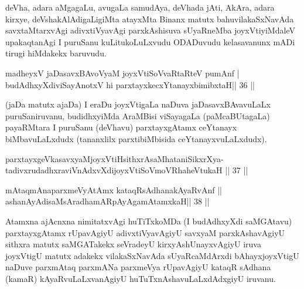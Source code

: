 \begin{artha}
deVha, adara aMgagaLu, avugaLa samudAya, deVhada jAti, AkAra, adara kirxye, deVshakAlAdigaLigiMta atayxMta Binanx matutx bahuvilakaSxNavAda savxtaMtarxvAgi adivxtiVyavAgi parxkAshisuva sUyaRneMba joyxVtiyiMdaleV upakaqtanAgi I puruSanu kuLitukoLuLxvudu ODADuvudu kelasavanunx mADi tirugi hiMdakekx baruvudu.
\end{artha}



\begin{shl}
madheyxV jaDasavxBAvoV\s yaM joyxVtiSoVvaRtaRteV pumAnf | \\
budAdhxyXdiviSayAnotxV hi parxtayxkecxYtanayxbimibxtaH\hfill ||  36 ||  
\end{shl}

\begin{artha}
(jaDa matutx ajaDa) I eraDu joyxVtigaLa naDuva jaDasavxBAvavuLaLx puruSaniruvanu, budidhxyiMda AraMBisi viSayagaLa (paMcaBUtagaLa) payaRMtara I puruSanu (deVhavu) parxtayxgAtamx ceYtanayx biMbavuLaLxdudx (tananxlilx parxtibiMbisida ceYtanayxvuLaLxdudx).
\end{artha}


\begin{shl}
parxtayxgeVkasavxyaMjoyxVtiHsithxrAsaMhataniSikxrXya-\\
tadivxrudadhxraviVnAdxvXdijoyxVtiSoVmoVRhaheVtukaH \hfill||  37 ||  
\end{shl}
				
\begin{shl}
mAtaqmAnaparxmeVyAtAmx kataqRsAdhanakAyaRvAnf ||  \\
ashanAyAdisaMsAradhamARpAyAgamAtamxkaH\hfill ||  38 || 
\end{shl}

\begin{artha}
Atamxna ajAcnxna nimitatxvAgi huTiTxkoMDa (I budAdhxyXdi saMGAtavu) parxtayxgAtamx rUpavAgiyU adivxtiVyavAgiyU savxyaM parxkAshavAgiyU sithxra matutx saMGATakekx seVradeyU kirxyAshUnayxvAgiyU iruva joyxVtigU matutx adakekx vilakaSxNavAda sUyaRcaMdArxdi bAhayxjoyxVtigU naDuve parxmAtaq parxmANa parxmeVya rUpavAgiyU kataqR sAdhana (kamaR) kAyaRvuLaLxvanAgiyU huTuTxnAshavuLaLxdAdxgiyU iruvanu.
\end{artha}

